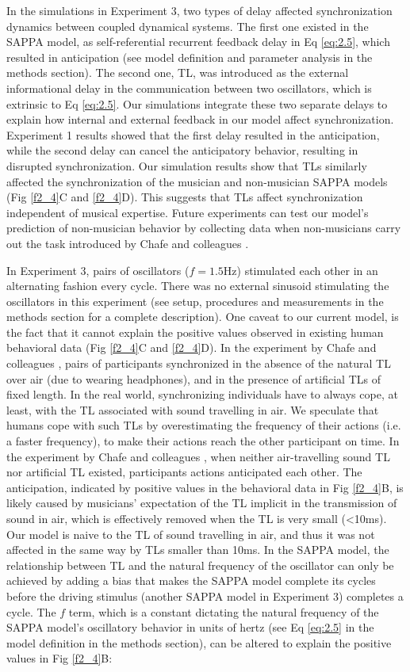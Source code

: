 \documentclass{report}
\begin{document}
In the simulations in Experiment 3, two types of delay affected synchronization dynamics between coupled dynamical systems. The first one existed in the SAPPA model, as self-referential recurrent feedback delay in Eq \eqref{eq:2.5}, which resulted in anticipation (see model definition and parameter analysis in the methods section). The second one, TL, was introduced as the external informational delay in the communication between two oscillators, which is extrinsic to Eq \eqref{eq:2.5}. Our simulations integrate these two separate delays to explain how internal and external feedback in our model affect synchronization. Experiment 1 results showed that the first delay resulted in the anticipation, while the second delay can cancel the anticipatory behavior, resulting in disrupted synchronization. Our simulation results show that TLs similarly affected the synchronization of the musician and non-musician SAPPA models (Fig \ref{f2_4}C and \ref{f2_4}D). This suggests that TLs affect synchronization independent of musical expertise. Future experiments can test our model's prediction of non-musician behavior by collecting data when non-musicians carry out the task introduced by Chafe and colleagues \cite{chafe2010effect}.

In Experiment 3, pairs of oscillators ($f = 1.5$Hz) stimulated each other in an alternating fashion every cycle. There was no external sinusoid stimulating the oscillators in this experiment (see setup, procedures and measurements in the methods section for a complete description). One caveat to our current model, is the fact that it cannot explain the positive values observed in existing human behavioral data (Fig \ref{f2_4}C and \ref{f2_4}D). In the experiment by Chafe and colleagues \cite{chafe2010effect}, pairs of participants synchronized in the absence of the natural TL over air (due to wearing headphones), and in the presence of artificial TLs of fixed length. In the real world, synchronizing individuals have to always cope, at least, with the TL associated with sound travelling in air. We speculate that humans cope with such TLs by overestimating the frequency of their actions (i.e. a faster frequency), to make their actions reach the other participant on time. In the experiment by Chafe and colleagues \cite{chafe2010effect}, when neither air-travelling sound TL nor artificial TL existed, participants actions anticipated each other. The anticipation, indicated by positive values in the behavioral data in Fig \ref{f2_4}B, is likely caused by musicians' expectation of the TL implicit in the transmission of sound in air, which is effectively removed when the TL is very small (<10ms). Our model is naive to the TL of sound travelling in air, and thus it was not affected in the same way by TLs smaller than 10ms. In the SAPPA model, the relationship between TL and the natural frequency of the oscillator can only be achieved by adding a bias that makes the SAPPA model complete its cycles before the driving stimulus (another SAPPA model in Experiment 3) completes a cycle. The $f$ term, which is a constant dictating the natural frequency of the SAPPA model's oscillatory behavior in units of hertz (see Eq \eqref{eq:2.5} in the model definition in the methods section), can be altered to explain the positive values in Fig \ref{f2_4}B:  
\end{document}

